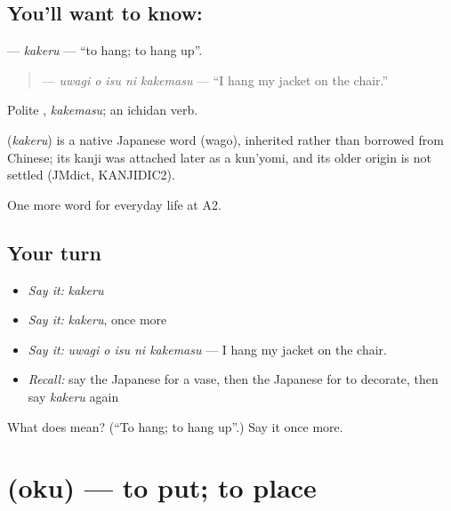 \subsection*{You'll want to know: }
\textbf{} — \emph{kakeru} — \textquotedblleft{}to hang; to hang up\textquotedblright{}.

\begin{quote}
\textbf{  } — \emph{uwagi o isu ni kakemasu} — \textquotedblleft{}I hang my jacket on the chair.\textquotedblright{}
\end{quote}

Polite \textbf{}, \emph{kakemasu}; an ichidan verb.

\begin{cousinweb}
\textbf{} (\emph{kakeru}) is a native Japanese word (wago), inherited rather than borrowed from Chinese; its kanji was attached later as a kun'yomi, and its older origin is not settled (JMdict, KANJIDIC2).
\end{cousinweb}

\begin{grammarlens}[title={What you've built}]
One more word for everyday life at A2.
\end{grammarlens}

\subsection*{Your turn}
\begin{itemize}
\raggedright
  \item \emph{Say it:} \emph{kakeru}
  \item \emph{Say it:} \emph{kakeru}, once more
  \item \emph{Say it:} \emph{uwagi o isu ni kakemasu} — I hang my jacket on the chair.
  \item \emph{Recall:} say the Japanese for a vase, then the Japanese for to decorate, then say \emph{kakeru} again
\end{itemize}

\begin{tcolorbox}[breakable,colback=teal!4,colframe=teal!35!black,title={Before you move on}]
What does  mean? (\textquotedblleft{}To hang; to hang up\textquotedblright{}.) Say it once more.
\end{tcolorbox}
\section[\texorpdfstring{\ja{おく} (oku)}{おく (oku)}]{ (oku) — to put; to place}

